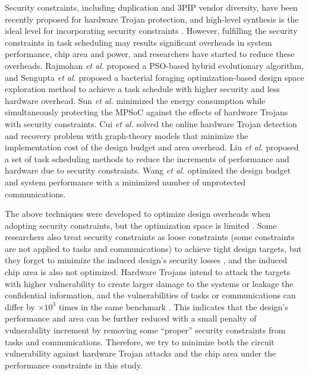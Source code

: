 \documentclass[10pt,journal, compsoc]{IEEEtran}
\begin{document}
Security constraints, including duplication and 3PIP vendor diversity, have been recently proposed for hardware Trojan protection, and high-level synthesis is the ideal level for incorporating security constraints \cite{conference:JR2}. However, fulfilling the security constraints in task scheduling may results significant overheads in system performance, chip area and power, and researchers have started to reduce these overheads. Rajmohan \textit{et al.} \cite{article:SR} proposed a PSO-based hybrid evolutionary algorithm, and Sengupta \textit{et al.} \cite{conference:AS} proposed a bacterial foraging optimization-based design space exploration method to achieve a task schedule with higher security and less hardware overhead. Sun \textit{et al.} \cite{article:YS} minimized the energy consumption while simultaneously protecting the MPSoC against the effects of hardware Trojans with security constraints. Cui \textit{et al.} \cite{article:XC} solved the online hardware Trojan detection and recovery problem with graph-theory models that minimize the implementation cost of the design budget and area overhead. Liu \textit{et al.}\cite{article:CL} proposed a set of task scheduling methods to reduce the increments of performance and hardware due to security constraints. Wang \textit{et al.} \cite{article:NW, conference:NW} optimized the design budget and system performance with a minimized number of unprotected communications.



The above techniques were developed to optimize design overheads when adopting security constraints, but the optimization space is limited \cite{article:SR, conference:AS, article:YS, article:XC}. Some researchers also treat security constraints as loose constraints (some constraints are not applied to tasks and communications) to achieve tight design targets, but they forget to minimize the induced design's security losses \cite{article:CL, article:NW, conference:NW}, and the induced chip area is also not optimized. Hardware Trojans intend to attack the targets with higher vulnerability to create larger damage to the systems or leakage the confidential information, and the vulnerabilities of tasks or communications can differ by $\times10^3$ times in the same benchmark \cite{conference:HS}. This indicates that the design's performance and area can be further reduced with a small penalty of vulnerability increment by removing some ``proper'' security constraints from tasks and communications. Therefore, we try to minimize both the circuit vulnerability against hardware Trojan attacks and the chip area under the performance constraints in this study.
\end{document}
